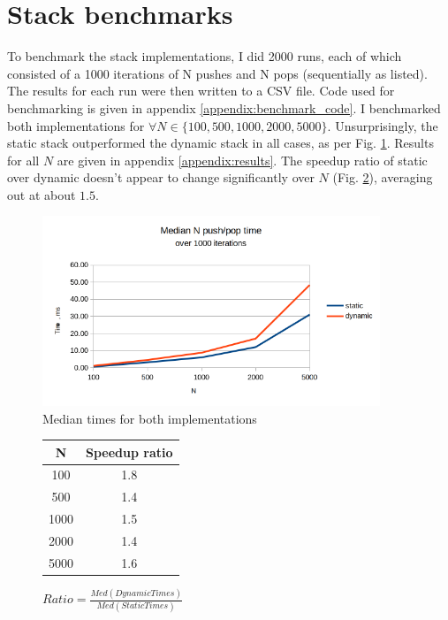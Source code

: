 \documentclass[a4paper,11pt]{article}
\begin{document}
    \section*{Stack benchmarks}

    To benchmark the stack implementations, I did 2000 runs, each of which consisted of a 1000 iterations of N pushes and N pops (sequentially as listed). The results for each run were then written to a CSV file. Code used for benchmarking is given in appendix \ref{appendix:benchmark_code}. I benchmarked both implementations for $\forall N\in\{100, 500, 1000, 2000, 5000\}$. Unsurprisingly, the static stack outperformed the dynamic stack in all cases, as per Fig. \ref{fig:median-times}. Results for all $N$ are given in appendix \ref{appendix:results}. The speedup ratio of static over dynamic doesn't appear to change significantly over $N$ (Fig. \ref{fig:ratio}), averaging out at about $1.5$.

    \begin{figure}[H]
        \centering
        \includegraphics[width=0.9\textwidth]{median.png}
        \caption{Median times for both implementations}
        \label{fig:median-times}
    \end{figure}

    \begin{figure}[H]
        \centering
        \begin{tabular}{c|c}
            N & Speedup ratio \\
            \hline
            \hline
            100 & 1.8 \\
            \hline
            500 & 1.4 \\
            \hline
            1000 & 1.5 \\
            \hline
            2000 & 1.4 \\
            \hline
            5000 & 1.6 \\
        \end{tabular}
        \caption{$Ratio = \frac{Med(DynamicTimes)}{Med(StaticTimes)}$}
        \label{fig:ratio}
    \end{figure}
\end{document}
